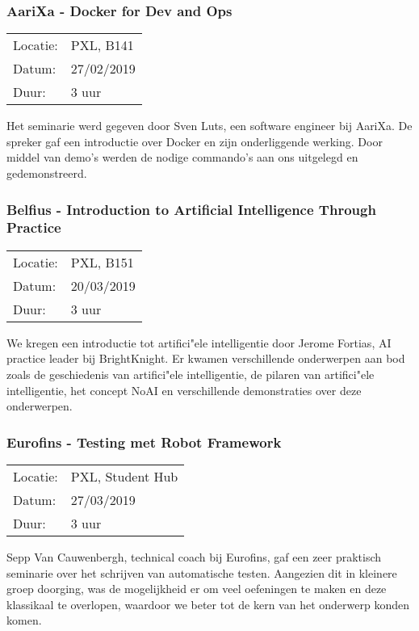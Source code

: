 \subsubsection{AariXa - Docker for Dev and Ops}

\begin{tabular}{l l}
  Locatie: & PXL, B141\\
  Datum: & 27/02/2019\\
  Duur: & 3 uur
\end{tabular}

Het seminarie werd gegeven door Sven Luts, een software engineer bij AariXa. De spreker gaf een introductie over Docker en zijn onderliggende werking. Door middel van demo's werden de nodige commando's aan ons uitgelegd en gedemonstreerd.

\subsubsection{Belfius - Introduction to Artificial Intelligence Through Practice}

\begin{tabular}{l l}
  Locatie: & PXL, B151\\
  Datum: & 20/03/2019\\
  Duur: & 3 uur
\end{tabular}

We kregen een introductie tot artifici"ele intelligentie door Jerome Fortias, AI practice leader bij BrightKnight. Er kwamen verschillende onderwerpen aan bod zoals de geschiedenis van artifici"ele intelligentie, de pilaren van artifici"ele intelligentie, het concept NoAI en verschillende demonstraties over deze onderwerpen.

\subsubsection{Eurofins - Testing met Robot Framework}

\begin{tabular}{l l}
  Locatie: & PXL, Student Hub\\
  Datum: & 27/03/2019\\
  Duur: & 3 uur
\end{tabular}

Sepp Van Cauwenbergh, technical coach bij Eurofins, gaf een zeer praktisch seminarie over het schrijven van automatische testen. Aangezien dit in kleinere groep doorging, was de mogelijkheid er om veel oefeningen te maken en deze klassikaal te overlopen, waardoor we beter tot de kern van het onderwerp konden komen.


